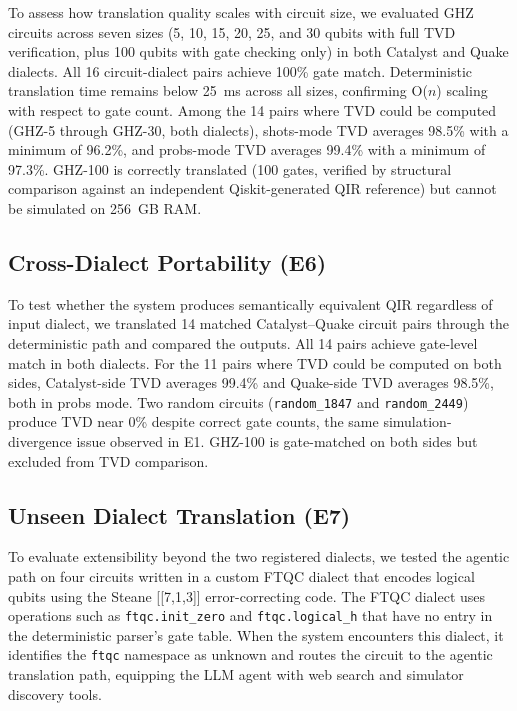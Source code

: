 \documentclass[conference]{IEEEtran}
\begin{document}
To assess how translation quality scales with circuit size, we evaluated GHZ circuits across seven sizes (5, 10, 15, 20, 25, and 30 qubits with full TVD verification, plus 100 qubits with gate checking only) in both Catalyst and Quake dialects. All 16 circuit-dialect pairs achieve 100\% gate match. Deterministic translation time remains below 25~ms across all sizes, confirming O($n$) scaling with respect to gate count. Among the 14 pairs where TVD could be computed (GHZ-5 through GHZ-30, both dialects), shots-mode TVD averages 98.5\% with a minimum of 96.2\%, and probs-mode TVD averages 99.4\% with a minimum of 97.3\%. GHZ-100 is correctly translated (100 gates, verified by structural comparison against an independent Qiskit-generated QIR reference) but cannot be simulated on 256~GB RAM.

\subsection{Cross-Dialect Portability (E6)}

To test whether the system produces semantically equivalent QIR regardless of input dialect, we translated 14 matched Catalyst--Quake circuit pairs through the deterministic path and compared the outputs. All 14 pairs achieve gate-level match in both dialects. For the 11 pairs where TVD could be computed on both sides, Catalyst-side TVD averages 99.4\% and Quake-side TVD averages 98.5\%, both in probs mode. Two random circuits (\texttt{random\_1847} and \texttt{random\_2449}) produce TVD near 0\% despite correct gate counts, the same simulation-divergence issue observed in E1. GHZ-100 is gate-matched on both sides but excluded from TVD comparison.

\subsection{Unseen Dialect Translation (E7)}

To evaluate extensibility beyond the two registered dialects, we tested the agentic path on four circuits written in a custom FTQC dialect that encodes logical qubits using the Steane [[7,1,3]] error-correcting code. The FTQC dialect uses operations such as \texttt{ftqc.init\_zero} and \texttt{ftqc.logical\_h} that have no entry in the deterministic parser's gate table. When the system encounters this dialect, it identifies the \texttt{ftqc} namespace as unknown and routes the circuit to the agentic translation path, equipping the LLM agent with web search and simulator discovery tools.
\end{document}
